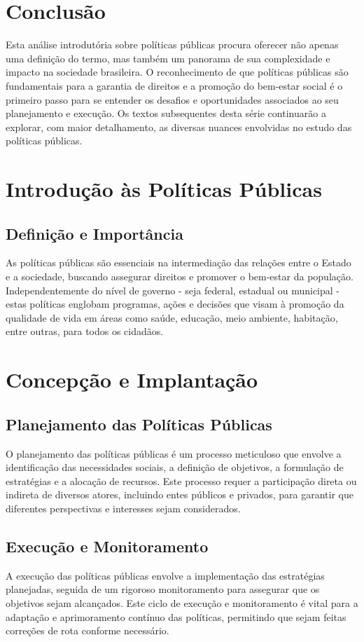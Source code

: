 \documentclass[
   article,       
   12pt,          
   oneside,       
   a4paper,       
   english,       
   brazil,        
   sumario=tradicional
   ]{abntex2}
\begin{document}
\section{Conclusão}
    Esta análise introdutória sobre políticas públicas procura oferecer não apenas uma definição do termo, mas também um panorama de sua complexidade e impacto na sociedade brasileira. O reconhecimento de que políticas públicas são fundamentais para a garantia de direitos e a promoção do bem-estar social é o primeiro passo para se entender os desafios e oportunidades associados ao seu planejamento e execução. Os textos subsequentes desta série continuarão a explorar, com maior detalhamento, as diversas nuances envolvidas no estudo das políticas públicas.
\section{Introdução às Políticas Públicas}
    \subsection{Definição e Importância}
        As políticas públicas são essenciais na intermediação das relações entre o Estado e a sociedade, buscando assegurar direitos e promover o bem-estar da população. Independentemente do nível de governo - seja federal, estadual ou municipal - estas políticas englobam programas, ações e decisões que visam à promoção da qualidade de vida em áreas como saúde, educação, meio ambiente, habitação, entre outras, para todos os cidadãos.

\section{Concepção e Implantação}
    \subsection{Planejamento das Políticas Públicas}
        O planejamento das políticas públicas é um processo meticuloso que envolve a identificação das necessidades sociais, a definição de objetivos, a formulação de estratégias e a alocação de recursos. Este processo requer a participação direta ou indireta de diversos atores, incluindo entes públicos e privados, para garantir que diferentes perspectivas e interesses sejam considerados.
        
    \subsection{Execução e Monitoramento}
        A execução das políticas públicas envolve a implementação das estratégias planejadas, seguida de um rigoroso monitoramento para assegurar que os objetivos sejam alcançados. Este ciclo de execução e monitoramento é vital para a adaptação e aprimoramento contínuo das políticas, permitindo que sejam feitas correções de rota conforme necessário.
\end{document}
